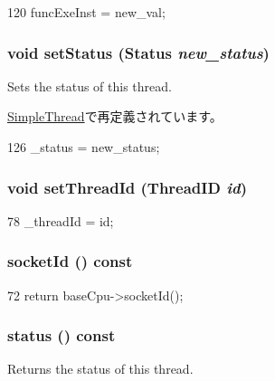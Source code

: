 \begin{DoxyCode}
120 { funcExeInst = new_val; }
\end{DoxyCode}
\hypertarget{structThreadState_acdf331c877974ed8697216475a21998d}{
\subsubsection[{setStatus}]{\setlength{\rightskip}{0pt plus 5cm}void setStatus ({\bf Status} {\em new\_\-status})}}
\label{structThreadState_acdf331c877974ed8697216475a21998d}
Sets the status of this thread. 

\hyperlink{classSimpleThread_a1ab41c7c20554bc6a9205b5b69d30406}{SimpleThread}で再定義されています。


\begin{DoxyCode}
126 { _status = new_status; }
\end{DoxyCode}
\hypertarget{structThreadState_ac0b004fcd497945d2cdd1a056f25a182}{
\subsubsection[{setThreadId}]{\setlength{\rightskip}{0pt plus 5cm}void setThreadId ({\bf ThreadID} {\em id})}}
\label{structThreadState_ac0b004fcd497945d2cdd1a056f25a182}



\begin{DoxyCode}
78 { _threadId = id; }
\end{DoxyCode}
\hypertarget{structThreadState_a1ff97b43199001357718671a4d922d12}{
\subsubsection[{socketId}]{ socketId () const}}
\label{structThreadState_a1ff97b43199001357718671a4d922d12}



\begin{DoxyCode}
72 { return baseCpu->socketId(); }
\end{DoxyCode}
\hypertarget{structThreadState_a2ad9e92a82d6f783b3061584729c2f4a}{
\subsubsection[{status}]{ status () const}}
\label{structThreadState_a2ad9e92a82d6f783b3061584729c2f4a}
Returns the status of this thread. 


